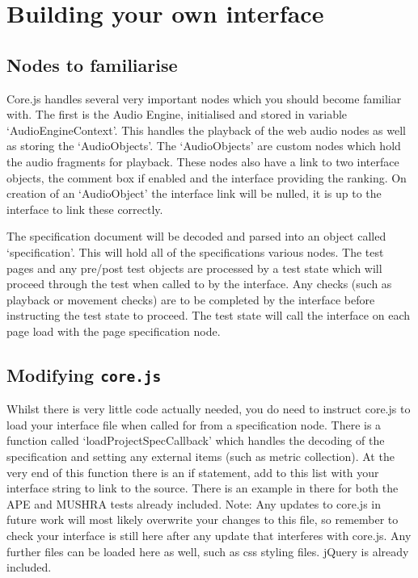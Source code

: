 \documentclass[11pt, oneside]{article}   	%
\begin{document}
\section{Building your own interface}

	\subsection{Nodes to familiarise}
		Core.js handles several very important nodes which you should become familiar with. The first is the Audio Engine, initialised and stored in variable `AudioEngineContext'. This handles the playback of the web audio nodes as well as storing the `AudioObjects'. The `AudioObjects' are custom nodes which hold the audio fragments for playback. These nodes also have a link to two interface objects, the comment box if enabled and the interface providing the ranking. On creation of an `AudioObject' the interface link will be nulled, it is up to the interface to link these correctly.

		The specification document will be decoded and parsed into an object called `specification'. This will hold all of the specifications various nodes. The test pages and any pre/post test objects are processed by a test state which will proceed through the test when called to by the interface. Any checks (such as playback or movement checks) are to be completed by the interface before instructing the test state to proceed. The test state will call the interface on each page load with the page specification node.

	\subsection{Modifying \texttt{core.js}}
		Whilst there is very little code actually needed, you do need to instruct core.js to load your interface file when called for from a specification node. There is a function called `loadProjectSpecCallback' which handles the decoding of the specification and setting any external items (such as metric collection). At the very end of this function there is an if statement, add to this list with your interface string to link to the source. There is an example in there for both the APE and MUSHRA tests already included. Note: Any updates to core.js in future work will most likely overwrite your changes to this file, so remember to check your interface is still here after any update that interferes with core.js.
		Any further files can be loaded here as well, such as css styling files. jQuery is already included.
\end{document}
